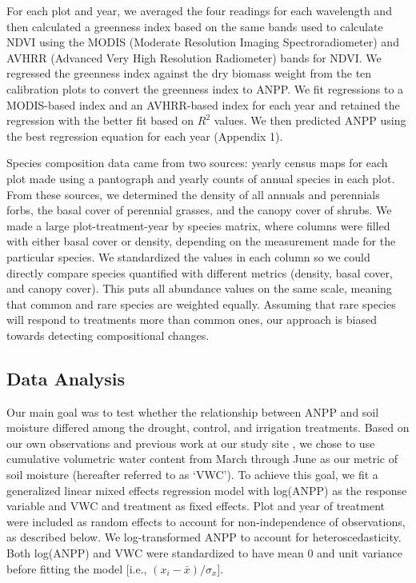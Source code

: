 \documentclass[fleqn,10pt,lineno]{wlpeerj} %
\begin{document}
For each plot and year, we averaged the four readings for each
wavelength and then calculated a greenness index based on the same bands
used to calculate NDVI using the MODIS (Moderate Resolution Imaging
Spectroradiometer) and AVHRR (Advanced Very High Resolution Radiometer)
bands for NDVI. We regressed the greenness index against the dry biomass
weight from the ten calibration plots to convert the greenness index to
ANPP. We fit regressions to a MODIS-based index and an AVHRR-based index
for each year and retained the regression with the better fit based on
\(R^2\) values. We then predicted ANPP using the best regression
equation for each year (Appendix 1).

Species composition data came from two sources: yearly census maps for
each plot made using a pantograph \citep{Hill1920} and yearly counts of
annual species in each plot. From these sources, we determined the
density of all annuals and perennials forbs, the basal cover of
perennial grasses, and the canopy cover of shrubs. We made a large
plot-treatment-year by species matrix, where columns were filled with
either basal cover or density, depending on the measurement made for the
particular species. We standardized the values in each column so we
could directly compare species quantified with different metrics
(density, basal cover, and canopy cover). This puts all abundance values
on the same scale, meaning that common and rare species are weighted
equally. Assuming that rare species will respond to treatments more than
common ones, our approach is biased towards detecting compositional
changes.

\subsection{Data Analysis}\label{data-analysis}

Our main goal was to test whether the relationship between ANPP and soil
moisture differed among the drought, control, and irrigation treatments.
Based on our own observations and previous work at our study site
\citep{Blaisdell1958, Dalgleish2011, Adler2012}, we chose to use
cumulative volumetric water content from March through June as our
metric of soil moisture (hereafter referred to as `VWC'). To achieve
this goal, we fit a generalized linear mixed effects regression model
with log(ANPP) as the response variable and VWC and treatment as fixed
effects. Plot and year of treatment were included as random effects to
account for non-independence of observations, as described below. We
log-transformed ANPP to account for heteroscedasticity. Both log(ANPP)
and VWC were standardized to have mean 0 and unit variance before
fitting the model {[}i.e., \((x_i - \bar{x})/\sigma_x\){]}.
\end{document}
